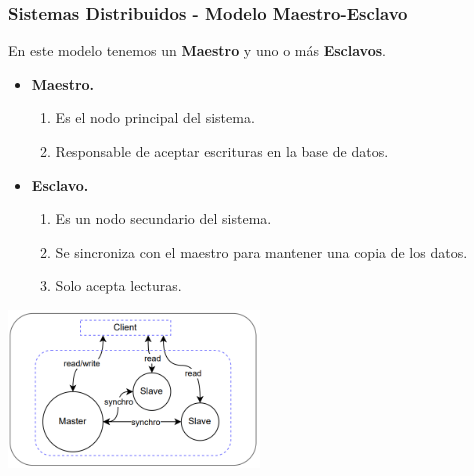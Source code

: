 \begin{frame}
    \frametitle{Sistemas Distribuidos - Modelo Maestro-Esclavo}

    En este modelo tenemos un \textbf{Maestro} y uno o más \textbf{Esclavos}.

     

    \begin{itemize}
        \item \textbf{Maestro.}
        
        \begin{enumerate}
            \item Es el nodo principal del sistema.
            \item Responsable de aceptar escrituras en la base de datos.
        \end{enumerate}
        
         

        \item \textbf{Esclavo.} 
        
        \begin{enumerate}
            \item Es un nodo secundario del sistema.
            \item Se sincroniza con el maestro para mantener una copia de los datos. 
            \item Solo acepta lecturas.
        \end{enumerate} 
    \end{itemize}

     

    \begin{center}
        \includegraphics[width=0.5\textwidth]{diagramas/maestro-esclavo.png}
    \end{center}
    
\end{frame}

